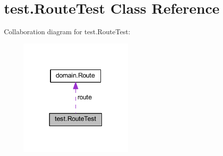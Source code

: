 \hypertarget{classtest_1_1_route_test}{}\section{test.\+Route\+Test Class Reference}
\label{classtest_1_1_route_test}


Collaboration diagram for test.\+Route\+Test\+:\nopagebreak
\begin{figure}[H]
\begin{center}
\leavevmode
\includegraphics[width=160pt]{classtest_1_1_route_test__coll__graph}
\end{center}
\end{figure}
